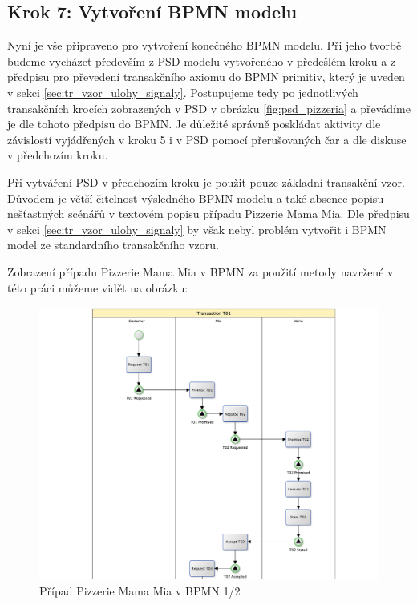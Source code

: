 \subsection{Krok 7: Vytvoření BPMN modelu}
Nyní je vše připraveno pro vytvoření konečného BPMN modelu. Při jeho tvorbě budeme vycházet především z PSD modelu vytvořeného v předešlém kroku a z předpisu pro převedení transakčního axiomu do BPMN primitiv, který je uveden v sekci \ref{sec:tr_vzor_ulohy_signaly}. Postupujeme tedy po jednotlivých transakčních krocích zobrazených v PSD v obrázku \ref{fig:psd_pizzeria} a převádíme je dle tohoto předpisu do BPMN. Je důležité správně poskládat aktivity dle závislostí vyjádřených v kroku 5 i v PSD pomocí přerušovaných čar a dle diskuse v předchozím kroku.

Při vytváření PSD v předchozím kroku je použit pouze základní transakční vzor. Důvodem je větší čitelnost výsledného BPMN modelu a také absence popisu nešťastných scénářů v textovém popisu případu Pizzerie Mama Mia. Dle předpisu v sekci \ref{sec:tr_vzor_ulohy_signaly} by však nebyl problém vytvořit i BPMN model ze standardního transakčního vzoru.

Zobrazení případu Pizzerie Mama Mia v BPMN za použití metody navržené v této práci můžeme vidět na obrázku:

\begin{center}
\begin{figure}[H]
\centerline{\includegraphics[width=1.28\textwidth,height=\textheight,keepaspectratio]{obrazky/pizzeria-bpmn-1}}
\caption{Případ Pizzerie Mama Mia v BPMN 1/2}
\label{fig:pizzeria_bpmn_1}
\end{figure}
\end{center}

